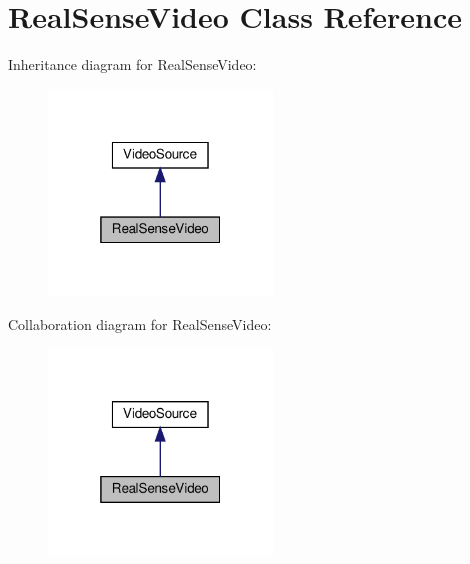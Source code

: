 \section{Real\+Sense\+Video Class Reference}
\label{class_real_sense_video}


Inheritance diagram for Real\+Sense\+Video\+:
\nopagebreak
\begin{figure}[H]
\begin{center}
\leavevmode
\includegraphics[width=169pt]{class_real_sense_video__inherit__graph}
\end{center}
\end{figure}


Collaboration diagram for Real\+Sense\+Video\+:
\nopagebreak
\begin{figure}[H]
\begin{center}
\leavevmode
\includegraphics[width=169pt]{class_real_sense_video__coll__graph}
\end{center}
\end{figure}
